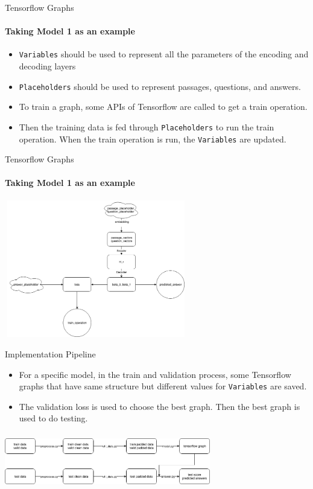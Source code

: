 \documentclass{beamer}
\begin{document}
\begin{frame}{Tensorflow Graphs}\framesubtitle{Taking Model 1 as an example}
     \begin{itemize}
         \item {\tt Variables} should be used to represent all the parameters of the encoding and decoding layers
         \item {\tt Placeholders} should be used to represent passages, questions, and answers.
         \item To train a graph, some APIs of Tensorflow are called to get a train operation.
         \item Then the training data is fed through {\tt Placeholders} to run the train operation. When the train operation is run, the {\tt Variables} are updated.
     \end{itemize}
\end{frame}

\begin{frame}{Tensorflow Graphs}\framesubtitle{Taking Model 1 as an example}
    \begin{center}
        \includegraphics[width=8cm, height=6cm]{figures/tf_graph.png}
    \end{center}
\end{frame}

\begin{frame}{Implementation Pipeline}
    \begin{itemize}
        \item For a specific model, in the train and validation process, some Tensorflow graphs that have same structure but different values for {\tt Variables} are saved.
        \item The validation loss is used to choose the best graph. Then the best graph is used to do testing.
    \end{itemize}
    \begin{center}
      \includegraphics[width=9cm, height=2.5cm]{figures/pipeline.png}
    \end{center}
\end{frame}
\end{document}
